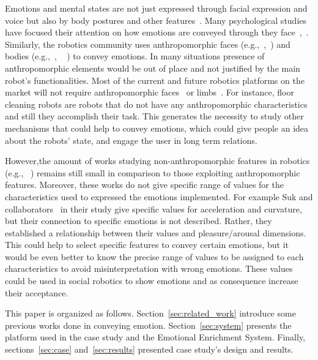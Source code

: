 Emotions and mental states are not just expressed through facial expression and voice but also by body postures and other features~\cite{Gelder2008}. Many psychological studies have focused their attention on how emotions are conveyed through they face~\cite{Ekman2004},~\cite{kleinsmith2012affective}. Similarly, the robotics community uses anthropomorphic faces (e.g.,~\cite{Arras2012},~\cite{Breazeal2002}) and bodies (e.g.,~\cite{Canamero2010},
~\cite{Destephe2013}
) to convey emotions.
In many situations presence of anthropomorphic elements would be out of place and not justified by the main robot's functionalities. Most of the current and future robotics platforms on the market will not require anthropomorphic faces~\cite{Breazeal2002} or limbs~\cite{Li2011}. For instance, floor cleaning robots are robots that do not have any anthropomorphic characteristics and still they accomplish their task.
This generates the necessity to study other mechanisms that could help to convey emotions, which could give people an idea about the robots' state, and engage the user in long term relations.

However,the amount of works studying non-anthropomorphic features in robotics (e.g.,~\cite{Saerbeck2010}
) remains still small in comparison to those exploiting anthropomorphic features. Moreover, these works do not give specific range of values for the characteristics used to expressed the emotions implemented. For example Suk and collaborators~\cite{NAM2014} in their study give specific values for acceleration and curvature,  but their connection to specific emotions is not described. Rather, they established a relationship between their values and pleasure/arousal dimensions. This could help to select specific features to convey certain emotions, but it would be even better to know the precise range of values to be assigned to each characteristics to avoid  misinterpretation with wrong emotions. These values could be used in social robotics to show emotions and as consequence increase their acceptance.

This paper is organized as follows. Section~\ref{sec:related_work} introduce some previous works done in conveying emotion. Section~\ref{sec:system} presents the platform used in the case study and the Emotional Enrichment System. Finally, sections~\ref{sec:case} and~\ref{sec:results} presented case study's design and results.